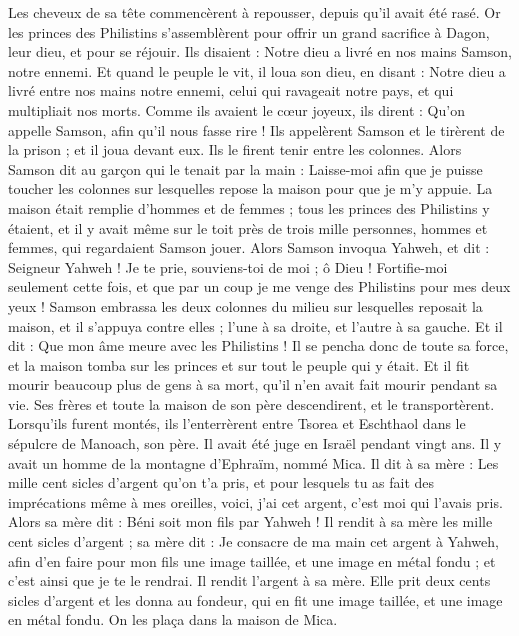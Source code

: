 \begin{multicols}{2}
Les cheveux de sa tête commencèrent à repousser, depuis qu'il avait été rasé.
Or les princes des Philistins s'assemblèrent pour offrir un grand sacrifice à Dagon, leur dieu, et pour se réjouir. Ils disaient : Notre dieu a livré en nos mains Samson, notre ennemi.
Et quand le peuple le vit, il loua son dieu, en disant : Notre dieu a livré entre nos mains notre ennemi, celui qui ravageait notre pays, et qui multipliait nos morts.
Comme ils avaient le cœur joyeux, ils dirent : Qu'on appelle  Samson, afin qu'il nous fasse rire ! Ils appelèrent Samson et le tirèrent de la prison ; et il joua devant eux. Ils le firent tenir entre les colonnes.
Alors Samson dit au garçon qui le tenait par la main : Laisse-moi afin que je puisse toucher les colonnes sur lesquelles repose la maison pour que je m'y appuie.
La maison était remplie d'hommes et de femmes ; tous les princes des Philistins y étaient, et il y avait même sur le toit près de trois mille personnes, hommes et femmes, qui regardaient Samson jouer.
Alors Samson invoqua Yahweh, et dit : Seigneur Yahweh ! Je te prie, souviens-toi de moi ; ô Dieu ! Fortifie-moi seulement cette fois, et que par un coup je me venge des Philistins pour mes deux yeux !
Samson embrassa les deux colonnes du milieu sur lesquelles reposait la maison, et il s'appuya contre elles ; l'une à sa droite, et l'autre à sa gauche.
Et il dit : Que mon âme meure avec les Philistins ! Il se pencha donc de toute sa force, et la maison tomba sur les princes et sur tout le peuple qui y était. Et il fit mourir beaucoup plus de gens à sa mort, qu'il n'en avait fait mourir pendant sa vie.
Ses frères et toute la maison de son père descendirent, et le transportèrent. Lorsqu'ils furent montés, ils l'enterrèrent entre Tsorea et Eschthaol dans le sépulcre de Manoach, son père. Il avait été juge en Israël pendant vingt ans.
\VerseOne{}Il y avait un homme de la montagne d'Ephraïm, nommé Mica.
Il dit à sa mère : Les mille cent sicles d'argent qu'on t'a pris, et pour lesquels tu as fait des imprécations même à mes oreilles, voici, j'ai cet argent, c'est moi qui l'avais pris. Alors sa mère dit : Béni soit mon fils par Yahweh !
Il rendit à sa mère les mille cent sicles d'argent ; sa mère dit : Je consacre de ma main cet argent à Yahweh, afin d'en faire pour mon fils une image taillée, et une image en métal fondu ; et c'est ainsi que je te le rendrai.
Il rendit l'argent à sa mère. Elle prit deux cents sicles d'argent et les donna au fondeur, qui en fit une image taillée, et une image en métal fondu.  On les plaça dans la maison de Mica.

\end{multicols}
